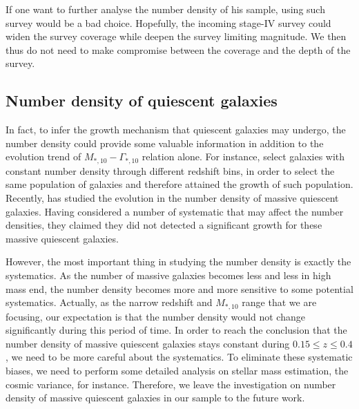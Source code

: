 \documentclass[fleqn,usenatbib]{mnras}
\begin{document}
If one want to further analyse the number density of his sample, using such survey would be a bad choice. Hopefully, the incoming stage-IV survey could widen the survey coverage while deepen the survey limiting magnitude. We then thus do not need to make compromise between the coverage and the depth of the survey.  
\subsection{Number density of quiescent galaxies}
In fact, to infer the growth mechanism that quiescent galaxies may undergo, the number density could provide some valuable information in addition to the evolution trend of $M_{*,10} - \Gamma_{*,10}$ relation alone. For instance, \cite{van_dokkum_growth_2010} select galaxies with constant number density through different redshift bins, in order to select the same population of galaxies and therefore attained the growth of such population. Recently,
 \cite{Bundy2017} has studied the evolution in the number density of massive quiescent galaxies. Having considered a number of systematic that may affect the number densities, they claimed they did not detected a significant growth for these massive quiescent galaxies. 
\par However, the most important thing in studying the number density is exactly the systematics. As the number of massive galaxies becomes less and less in high mass end, the number density becomes more and more sensitive to some potential systematics. Actually, as the narrow redshift and $M_{*,10}$ range that we are focusing, our expectation is that the number density would not change significantly during this period of time. In order to reach the conclusion that the number density of massive quiescent galaxies stays constant during $0.15 \leq z \leq 0.4$, we need to be more careful about the systematics. To eliminate these systematic biases, we need to perform some detailed analysis on stellar mass estimation, the cosmic variance, for instance. Therefore, we leave the investigation on number density of massive quiescent galaxies in our sample to the future work.  
\end{document}
